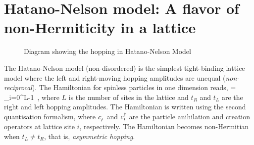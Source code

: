 \section{Hatano-Nelson model: A flavor of non-Hermiticity in a lattice}
\begin{figure}[H]
    \centering 
    
    \caption{Diagram showing the hopping in Hatano-Nelson Model}
\end{figure}%
The Hatano-Nelson model (non-disordered) is the simplest tight-binding
lattice model where the left and right-moving hopping amplitudes are unequal
(\emph{non-reciprocal}). The Hamiltonian for spinless particles in one dimension reads,
\blgn
 \hHN = \sum_{i=0}^{L-1} \big[t_R c\y_i c\py_{i+1} + t_L c\y_{i+1} c\py_i \big]\,,   
\elgn
where $L$ is the number of sites in the lattice and $t_R$ and $t_L$ are the right and left hopping
amplitudes. The Hamiltonian is written using the second quantisation formalism, where $c\py_i$ and  $c^\dag_i$ are the particle anihilation and
creation operators at lattice site $i$, respectively. {The Hamiltonian becomes non-Hermitian when $t_L\neq t_R$, that is, \textit{asymmetric hopping}.} 

